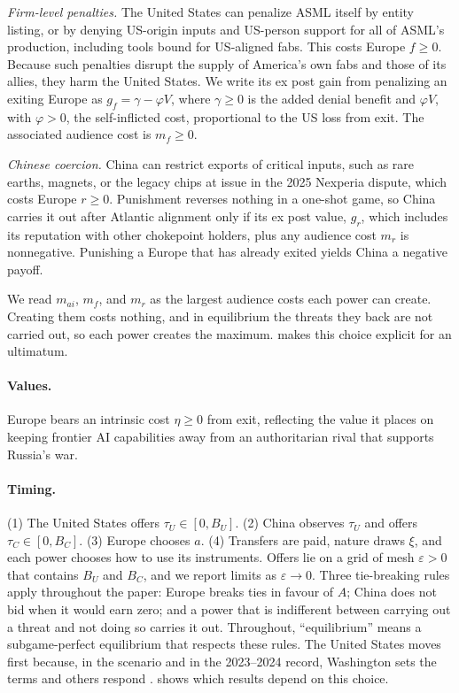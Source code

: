 \emph{Firm-level penalties.} The United States can penalize ASML itself by entity listing, or by denying US-origin inputs and US-person support for all of ASML's production, including tools bound for US-aligned fabs. This costs Europe $f \geq 0$. Because such penalties disrupt the supply of America's own fabs and those of its allies, they harm the United States. We write its ex post gain from penalizing an exiting Europe as $g_f = \gamma - \varphi V$, where $\gamma \geq 0$ is the added denial benefit and $\varphi V$, with $\varphi>0$, the self-inflicted cost, proportional to the US loss from exit. The associated audience cost is $m_f \geq 0$.

\emph{Chinese coercion.} China can restrict exports of critical inputs, such as rare earths, magnets, or the legacy chips at issue in the 2025 Nexperia dispute, which costs Europe $r \geq 0$. Punishment reverses nothing in a one-shot game, so China carries it out after Atlantic alignment only if its ex post value, $g_r$, which includes its reputation with other chokepoint holders, plus any audience cost $m_r$ is nonnegative. Punishing a Europe that has already exited yields China a negative payoff.

We read $m_{ai}$, $m_f$, and $m_r$ as the largest audience costs each power can create. Creating them costs nothing, and in equilibrium the threats they back are not carried out, so each power creates the maximum.  makes this choice explicit for an ultimatum.

\paragraph{Values.} Europe bears an intrinsic cost $\eta \geq 0$ from exit, reflecting the value it places on keeping frontier AI capabilities away from an authoritarian rival that supports Russia's war.

\paragraph{Timing.} (1) The United States offers $\tau_U \in [0,B_U]$. (2) China observes $\tau_U$ and offers $\tau_C \in [0,B_C]$. (3) Europe chooses $a$. (4) Transfers are paid, nature draws $\xi$, and each power chooses how to use its instruments. Offers lie on a grid of mesh $\varepsilon>0$ that contains $B_U$ and $B_C$, and we report limits as $\varepsilon \to 0$. Three tie-breaking rules apply throughout the paper: Europe breaks ties in favour of $A$; China does not bid when it would earn zero; and a power that is indifferent between carrying out a threat and not doing so carries it out. Throughout, ``equilibrium'' means a subgame-perfect equilibrium that respects these rules. The United States moves first because, in the scenario and in the 2023--2024 record, Washington sets the terms and others respond \citep[cf.][]{groseclose1996buying}.  shows which results depend on this choice.

